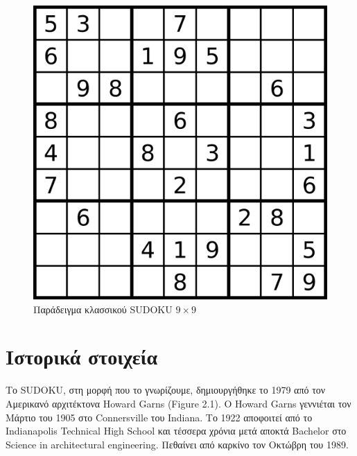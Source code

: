 \documentclass[12pt]{book}
\theoremstyle{definition}
\begin{document}
\begin{figure}[h]
	\centering	
	\includegraphics[scale=0.2]{Figures/classicSUDOKU.jpeg}
	\caption{Παράδειγμα κλασσικού SUDOKU \( 9 \times 9\) }
\end{figure}

\chapter{Ιστορικά στοιχεία}

Το SUDOKU, στη μορφή που το γνωρίζουμε, δημιουργήθηκε το 1979 από τον Αμερικανό αρχιτέκτονα Howard Garns (Figure 2.1). O Howard Garns \cite{1} γεννιέται τον Μάρτιο του 1905 στο Connersville του Indiana. Το 1922 αποφοιτεί από το Indianapolis Technical High School και τέσσερα χρόνια μετά αποκτά Bachelor στο Science in architectural engineering. Πεθαίνει από καρκίνο τον Οκτώβρη του 1989.  \par
\end{document}
